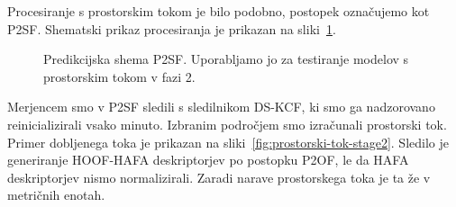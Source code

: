 Procesiranje s prostorskim tokom je bilo podobno, postopek označujemo kot P2SF. Shematski prikaz procesiranja je prikazan na sliki~\ref{fig:diagram-procesiranja-sf-stage2}.

\begin{figure}[!htb]
	\centering
	\resizebox{\columnwidth}{!}{}
	\caption[Predikcijska shema P2SF]{Predikcijska shema P2SF. Uporabljamo jo za testiranje modelov s prostorskim tokom v fazi 2.}
	\label{fig:diagram-procesiranja-sf-stage2}
\end{figure}

Merjencem smo v P2SF sledili s sledilnikom DS-KCF, ki smo ga nadzorovano reinicializirali vsako minuto. Izbranim področjem smo izračunali prostorski tok. Primer dobljenega toka je prikazan na sliki~\ref{fig:prostorski-tok-stage2}. Sledilo je generiranje HOOF-HAFA deskriptorjev po postopku P2OF, le da HAFA deskriptorjev nismo normalizirali. Zaradi narave prostorskega toka je ta že v metričnih enotah.

